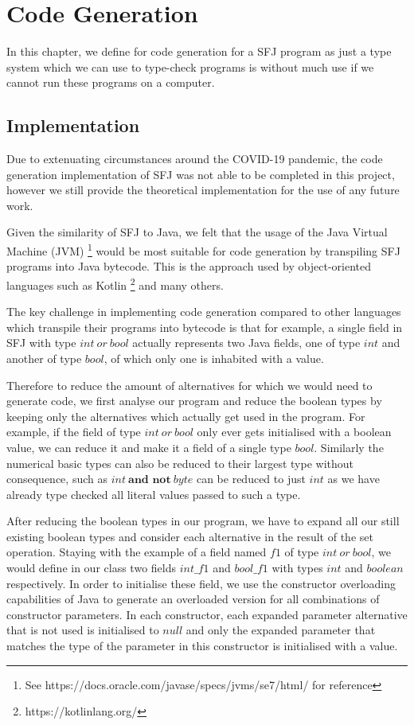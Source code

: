 \documentclass{l4proj}
\begin{document}
\chapter{Code Generation}

In this chapter, we define for code generation for a SFJ program as just a type system which we can use to type-check programs is without much use if we cannot run these programs on a computer.

\section{Implementation}

Due to extenuating circumstances around the COVID-19 pandemic, the code generation implementation of SFJ was not able to be completed in this project, however we still provide the theoretical implementation for the use of any future work.

Given the similarity of SFJ to Java, we felt that the usage of the Java Virtual Machine (JVM) \footnote{See https://docs.oracle.com/javase/specs/jvms/se7/html/ for reference} would be most suitable for code generation by transpiling SFJ programs into Java bytecode.
This is the approach used by object-oriented languages such as Kotlin \footnote{https://kotlinlang.org/} and many others.

The key challenge in implementing code generation compared to other languages which transpile their programs into bytecode is that for example, a single field in SFJ with type $int\ or\ bool$ actually represents two Java fields, one of type $int$ and another of type $bool$, of which only one is inhabited with a value.

Therefore to reduce the amount of alternatives for which we would need to generate code, we first analyse our program and reduce the boolean types by keeping only the alternatives which actually get used in the program.
For example, if the field of type $int\ or\ bool$ only ever gets initialised with a boolean value, we can reduce it and make it a field of a single type $bool$.
Similarly the numerical basic types can also be reduced to their largest type without consequence, such as $int\ \textbf{and not}\ byte$ can be reduced to just $int$ as we have already type checked all literal values passed to such a type.

After reducing the boolean types in our program, we have to expand all our still existing boolean types and consider each alternative in the result of the set operation.
Staying with the example of a field named $f1$ of type $int\ or\ bool$, we would define in our class two fields $int\_f1$ and $bool\_f1$ with types $int$ and $boolean$ respectively.
In order to initialise these field, we use the constructor overloading capabilities of Java to generate an overloaded version for all combinations of constructor parameters.
In each constructor, each expanded parameter alternative that is not used is initialised to $null$ and only the expanded parameter that matches the type of the parameter in this constructor is initialised with a value.
\end{document}

